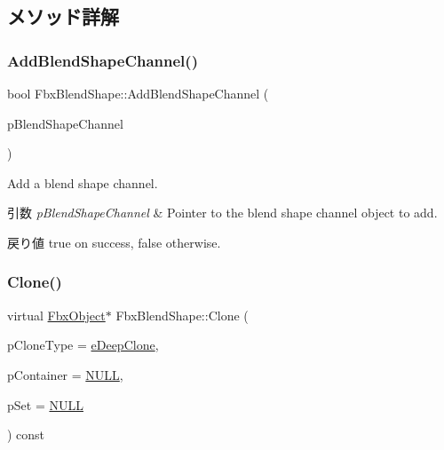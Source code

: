\subsection{メソッド詳解}
\mbox{\label{class_fbx_blend_shape_a0513dbd59321be93fd18f3aeae79b49a}} 
\subsubsection{\texorpdfstring{Add\+Blend\+Shape\+Channel()}{AddBlendShapeChannel()}}
{\footnotesize\ttfamily bool Fbx\+Blend\+Shape\+::\+Add\+Blend\+Shape\+Channel (\begin{DoxyParamCaption}\item[{\hyperlink{class_fbx_blend_shape_channel}{Fbx\+Blend\+Shape\+Channel} $\ast$}]{p\+Blend\+Shape\+Channel }\end{DoxyParamCaption})}

Add a blend shape channel. 
\begin{DoxyParams}{引数}
{\em p\+Blend\+Shape\+Channel} & Pointer to the blend shape channel object to add. \\
\hline
\end{DoxyParams}
\begin{DoxyReturn}{戻り値}
{\ttfamily true} on success, {\ttfamily false} otherwise. 
\end{DoxyReturn}
\mbox{\label{class_fbx_blend_shape_aea5560eb695574977b5e7b8d0387d81a}} 
\subsubsection{\texorpdfstring{Clone()}{Clone()}}
{\footnotesize\ttfamily virtual \hyperlink{class_fbx_object}{Fbx\+Object}$\ast$ Fbx\+Blend\+Shape\+::\+Clone (\begin{DoxyParamCaption}\item[{\hyperlink{class_fbx_object_a9f5626b2d2135684d6ea1e6e4ad2acbb}{Fbx\+Object\+::\+E\+Clone\+Type}}]{p\+Clone\+Type = {\ttfamily \hyperlink{class_fbx_object_a9f5626b2d2135684d6ea1e6e4ad2acbbaacdf137ca059c572798287e98c4236d0}{e\+Deep\+Clone}},  }\item[{\hyperlink{class_fbx_object}{Fbx\+Object} $\ast$}]{p\+Container = {\ttfamily \hyperlink{fbxarch_8h_a070d2ce7b6bb7e5c05602aa8c308d0c4}{N\+U\+LL}},  }\item[{void $\ast$}]{p\+Set = {\ttfamily \hyperlink{fbxarch_8h_a070d2ce7b6bb7e5c05602aa8c308d0c4}{N\+U\+LL}} }\end{DoxyParamCaption}) const\hspace{0.3cm}{\ttfamily [virtual]}}

